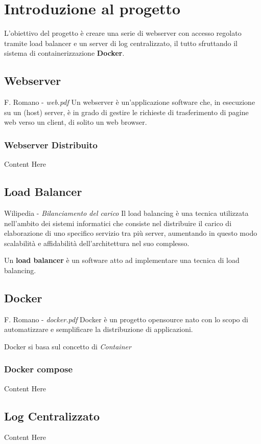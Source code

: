 \documentclass[../DocumentazioneProgetto.tex]{subfiles}
\begin{document}
	\section{Introduzione al progetto}
	L'obiettivo del progetto è creare una serie di webserver con accesso regolato tramite load balancer e un server di log centralizzato, il tutto sfruttando il sistema di containerizzazione \textbf{Docker}.
	\subsection{Webserver} 
	\begin{aquote}{F. Romano - \textit{web.pdf}}
		Un webserver è un'applicazione software che, in esecuzione su un (host) server, è in grado di gestire le richieste di trasferimento di pagine web verso un client, di solito un web browser.
	\end{aquote}
	\subsubsection{Webserver Distribuito} 
	Content Here
	\subsection{Load Balancer}
	\begin{aquote}{Wilipedia - \textit{Bilanciamento del carico}}
	Il load balancing è una tecnica utilizzata nell'ambito dei sistemi informatici che consiste nel distribuire il carico di elaborazione di uno specifico servizio tra più server, aumentando in questo modo scalabilità e affidabilità dell'architettura nel suo complesso.
	\end{aquote}
	Un \textbf{load balancer} è un software atto ad implementare una tecnica di load balancing. 
	\subsection{Docker} 
	\begin{aquote}{F. Romano - \textit{docker.pdf}}
		Docker è un progetto opensource nato con lo scopo di automatizzare e semplificare la distribuzione di applicazioni.
	\end{aquote}
	Docker si basa sul concetto di \textit{Container} 
	\subsubsection{Docker compose} 
	Content Here
	\subsection{Log Centralizzato} 
	Content Here
\end{document}
